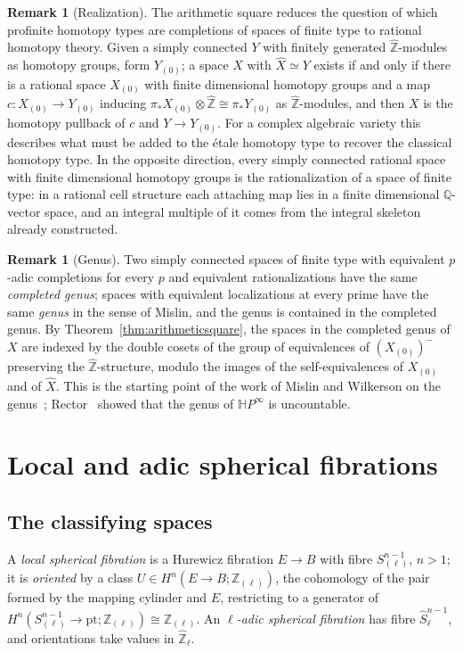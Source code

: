 \documentclass[11pt]{amsart}
\theoremstyle{plain}
\theoremstyle{definition}
\newtheorem{remark}[theorem]{Remark}
\numberwithin{equation}{section}
\newcommand{\Q}{\mathbb{Q}}
\newcommand{\Zhat}{\widehat{\mathbb{Z}}}
\newcommand{\Zl}{\mathbb{Z}_{(\ell)}}
\newcommand{\HP}{\mathbb{H}P}
\newcommand{\hX}{\widehat{X}}
\begin{document}
\begin{remark}[Realization]\label{rem:realization}
The arithmetic square reduces the question of which profinite homotopy types are completions of spaces of finite type to rational homotopy theory.
Given a simply connected $Y$ with finitely generated $\Zhat$-modules as homotopy groups, form $Y_{(0)}$; a space $X$ with $\hX\simeq Y$ exists if and only if there is a rational space $X_{(0)}$ with finite dimensional homotopy groups and a map $c\colon X_{(0)}\to Y_{(0)}$ inducing $\pi_*X_{(0)}\otimes\Zhat\cong\pi_*Y_{(0)}$ as $\Zhat$-modules, and then $X$ is the homotopy pullback of $c$ and $Y\to Y_{(0)}$.
For a complex algebraic variety this describes what must be added to the \'etale homotopy type to recover the classical homotopy type.
In the opposite direction, every simply connected rational space with finite dimensional homotopy groups is the rationalization of a space of finite type: in a rational cell structure each attaching map lies in a finite dimensional $\Q$-vector space, and an integral multiple of it comes from the integral skeleton already constructed.
\end{remark}

\begin{remark}[Genus]
Two simply connected spaces of finite type with equivalent $p$-adic completions for every $p$ and equivalent rationalizations have the same \emph{completed genus}; spaces with equivalent localizations at every prime have the same \emph{genus} in the sense of Mislin, and the genus is contained in the completed genus.
By Theorem~\ref{thm:arithmeticsquare}, the spaces in the completed genus of $X$ are indexed by the double cosets of the group of equivalences of $(X_{(0)})^-$ preserving the $\Zhat$-structure, modulo the images of the self-equivalences of $X_{(0)}$ and of $\hX$.
This is the starting point of the work of Mislin and Wilkerson on the genus~\cite{WilkersonGenus}; Rector~\cite{Rector} showed that the genus of $\HP^\infty$ is uncountable.
\end{remark}


\section{Local and adic spherical fibrations}\label{sec:spherical}

\subsection{The classifying spaces}
A \emph{local spherical fibration} is a Hurewicz fibration $E\to B$ with fibre $S^{n-1}_{(\ell)}$, $n>1$; it is \emph{oriented} by a class $U\in H^n(E\to B;\Zl)$, the cohomology of the pair formed by the mapping cylinder and $E$, restricting to a generator of $H^n(S^{n-1}_{(\ell)}\to\mathrm{pt};\Zl)\cong\Zl$.
An \emph{$\ell$-adic spherical fibration} has fibre $\widehat S^{n-1}_\ell$, and orientations take values in $\Zhat_\ell$.
\end{document}
